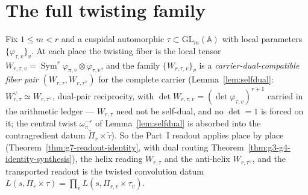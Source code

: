 \documentclass[11pt]{article}
\theoremstyle{definition}
\newcommand{\Sym}{\operatorname{Sym}}
\begin{document}
\section{The full twisting family}\label{sec:cps-twist}
Fix $1\le m<r$ and a cuspidal automorphic $\tau\subset\mathrm{GL}_m(\mathbb A)$ with local parameters
$\{\varphi_{\tau,v}\}_v$. At each place the twisting fiber is the local tensor
$W_{r,\tau,v}=\Sym^r\varphi_{\pi,v}\otimes\varphi_{\tau,v}$, and the family
$\{W_{r,\tau,v}\}_v$ is a \emph{carrier-dual-compatible fiber pair} $(W_{r,\tau},W_{r,\tau^\vee})$ for the
complete carrier (Lemma~\ref{lem:selfdual}: $W_{r,\tau}^\vee\simeq W_{r,\tau^\vee}$, dual-pair reciprocity, with
$\det W_{r,\tau,v}=(\det\varphi_{\tau,v})^{r+1}$ carried in the arithmetic ledger --- $W_{r,\tau}$ need not be self-dual, and no $\det=1$ is forced on it; the central twist $\omega_\pi^{-r}$ of Lemma~\ref{lem:selfdual} is absorbed into the contragredient datum $\widetilde\Pi_r\times\widetilde\tau$). So the Part~I readout applies place by place (Theorem~\ref{thm:g7-readout-identity}, with dual routing Theorem~\ref{thm:g3-g4-identity-synthesis}), the helix
reading $W_{r,\tau}$ and the anti-helix $W_{r,\tau^\vee}$, and the transported readout is the twisted
convolution datum $L(s,\Pi_r\times\tau)=\prod_v L(s,\Pi_{r,v}\times\tau_v)$.
\end{document}
